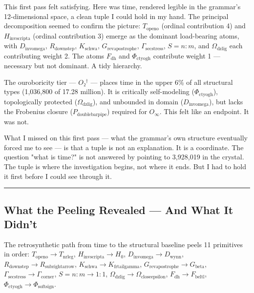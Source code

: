 \documentclass[12pt,a4paper]{article}
\begin{document}
This first pass felt satisfying. Here was time, rendered legible in the grammar's 12-dimensional space, a clean tuple I could hold in my hand. The principal decomposition seemed to confirm the picture: $T_{\text{openo}}$ (ordinal contribution 4) and $H_{\text{invscripta}}$ (ordinal contribution 3) emerge as the dominant load-bearing atoms, with $D_{\text{invomega}}$, $R_{\text{downstep}}$, $K_{\text{schwa}}$, $G_{\text{revapostrophe}}$, $\Gamma_{\text{secstress}}$, $S = n{:}m$, and $\Omega_{\text{dzlig}}$ each contributing weight 2. The atoms $F_{\text{dh}}$ and $\Phi_{\text{ctyogh}}$ contribute weight 1 --- necessary but not dominant. A tidy hierarchy.

The ouroboricity tier --- $O₂^\dagger$ --- places time in the upper 6\% of all structural types (1,036,800 of 17.28 million). It is critically self-modeling ($\Phi_{\text{ctyogh}}$), topologically protected ($\Omega_{\text{dzlig}}$), and unbounded in domain ($D_{\text{invomega}}$), but lacks the Frobenius closure ($P_{\text{doublebarpipe}}$) required for $O_{\infty}$. This felt like an endpoint. It was not.

What I missed on this first pass --- what the grammar's own structure eventually forced me to see --- is that a tuple is not an explanation. It is a coordinate. The question "what is time?" is not answered by pointing to 3,928,019 in the crystal. The tuple is where the investigation begins, not where it ends. But I had to hold it first before I could see through it.

\begin{center}
\rule{0.5\textwidth}{0.4pt}
\end{center}

\subsection{What the Peeling Revealed --- And What It Didn't}

The retrosynthetic path from time to the structural baseline peels 11 primitives in order: $T_{\text{openo}} \to T_{\text{nrleg}}$, $H_{\text{invscripta}} \to H_0$, $D_{\text{invomega}} \to D_{\text{wynn}}$, $R_{\text{downstep}} \to R_{\text{subrightarrow}}$, $K_{\text{schwa}} \to K_{\text{frtailgamma}}$, $G_{\text{revapostrophe}} \to G_{\text{beta}}$, $\Gamma_{\text{secstress}} \to \Gamma_{\text{corner}}$, $S = n{:}m \to 1{:}1$, $\Omega_{\text{dzlig}} \to \Omega_{\text{closeepsilon}}$, $F_{\text{dh}} \to F_{\text{beltl}}$, $\Phi_{\text{ctyogh}} \to \Phi_{\text{softsign}}$.
\end{document}
